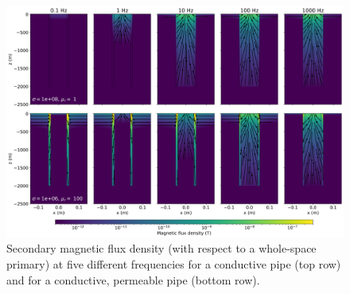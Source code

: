 \begin{figure}
    \begin{center}
    \includegraphics[width=\columnwidth]{figures/bfdem.png}
    \end{center}
\caption{
    Secondary magnetic flux density (with respect to a whole-space primary) at five different frequencies for a conductive pipe (top row)
    and for a conductive, permeable pipe (bottom row).
}
\label{fig:bfdem}
\end{figure}
